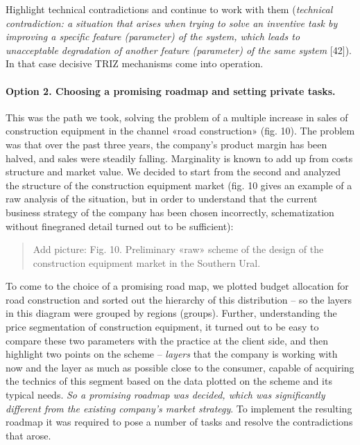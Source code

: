 \documentclass[11pt,a4paper]{book}
\newcommand{\addpicture}[1]{
  \begin{quote} Add picture: #1\end{quote}
}
\begin{document}
Highlight technical contradictions and continue to work with them
(\emph{technical contradiction: a situation that arises when trying to solve
  an inventive task by improving a specific feature (parameter) of the system,
  which leads to unacceptable degradation of another feature (parameter) of
  the same system} [42]). In that case decisive TRIZ mechanisms come into
operation.

\paragraph{Option 2. Choosing a promising roadmap and setting private tasks.}
This was the path we took, solving the problem of a multiple increase in sales
of construction equipment in the channel «road construction» (fig. 10). The
problem was that over the past three years, the company's product margin has
been halved, and sales were steadily falling. Marginality is known to add up
from costs structure and market value. We decided to start from the second and
analyzed the structure of the construction equipment market (fig. 10 gives an
example of a raw analysis of the situation, but in order to understand that
the current business strategy of the company has been chosen incorrectly,
schematization without finegraned detail turned out to be sufficient):

\addpicture{Fig. 10. Preliminary «raw» scheme of the design of the
  construction equipment market in the Southern Ural.}

To come to the choice of a promising road map, we plotted budget allocation
for road construction and sorted out the hierarchy of this distribution -- so
the layers in this diagram were grouped by regions (groups). Further,
understanding the price segmentation of construction equipment, it turned out
to be easy to compare these two parameters with the practice at the client
side, and then highlight two points on the scheme -- \emph{layers} that the
company is working with now and the layer as much as possible close to the
consumer, capable of acquiring the technics of this segment based on the data
plotted on the scheme and its typical needs. \emph{So a promising roadmap was
  decided, which was significantly different from the existing company’s
  market strategy}. To implement the resulting roadmap it was required to pose
a number of tasks and resolve the contradictions that arose.
\end{document}
